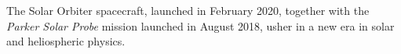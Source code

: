 The Solar Orbiter spacecraft, launched in February 2020, together with the \textit{Parker Solar Probe} mission launched in August 2018, usher in a new era in solar and heliospheric physics. 

